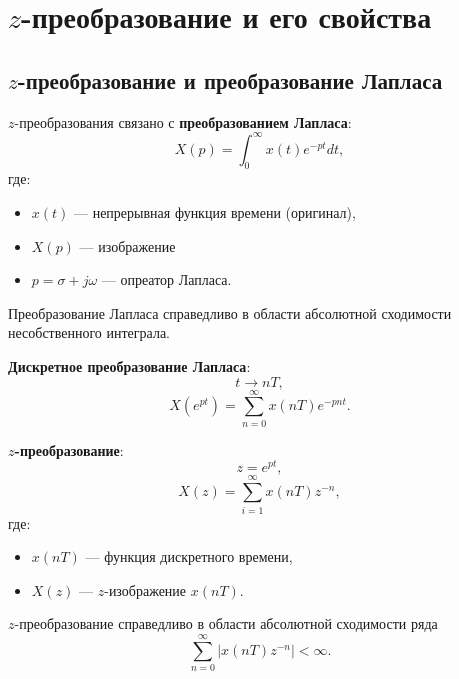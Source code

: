 \documentclass[a4paper, 14pt]{extarticle}
\begin{document}
\section{$z$-преобразование и его свойства}\label{sec:loran}
\subsection{$z$-преобразование и преобразование Лапласа}
$z$-преобразования связано с \textbf{преобразованием Лапласа}:
\begin{equation}
    X(p) = \int_0^\infty x(t) e^{-pt} dt,
\end{equation}
где:
\begin{itemize}
    \item $x(t)$ --- непрерывная функция времени (оригинал),
    \item $X(p)$ --- изображение
    \item $p = \sigma + j \omega$ --- опреатор Лапласа.
\end{itemize}

Преобразование Лапласа справедливо в области абсолютной сходимости несобственного интеграла.

\textbf{Дискретное преобразование Лапласа}:
\begin{equation}
    t \to nT,
\end{equation}
\begin{equation}
    X(e^{pt}) = \sum^{\infty}_{n=0} x(nT) e^{-pnt}.
\end{equation}

\textbf{$z$-преобразование}:
\begin{equation}
    z = e^{pt},
\end{equation}
\begin{equation}
    X(z) = \sum^{\infty}_{i=1} x(nT) z^{-n},
\end{equation}
где:
\begin{itemize}
    \item $x(nT)$ --- функция дискретного времени,
    \item $X(z)$ --- $z$-изображение $x(nT)$.
\end{itemize}

$z$-преобразование справедливо в области абсолютной сходимости ряда
\begin{equation}
    \sum^{\infty}_{n=0} | x(nT) z^{-n} | < \infty.
\end{equation}
\end{document}
